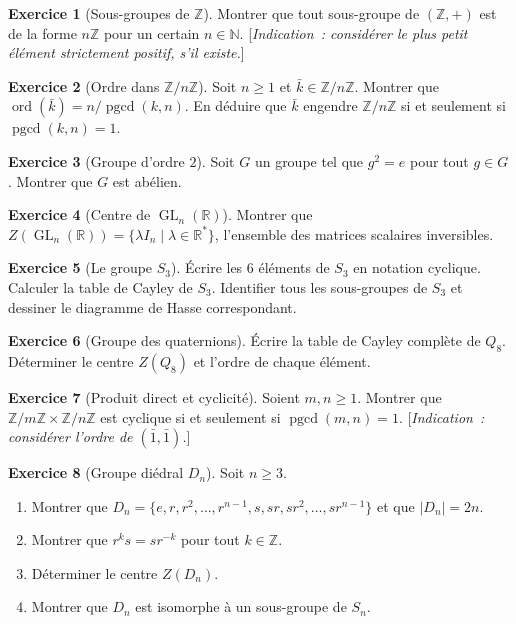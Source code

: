 \documentclass[12pt,a4paper,openany]{book}
\theoremstyle{definition}
\newtheorem{exercice}{Exercice}[chapter]
\newcommand{\N}{\mathbb{N}}
\newcommand{\Z}{\mathbb{Z}}
\newcommand{\R}{\mathbb{R}}
\DeclareMathOperator{\ord}{ord}
\DeclareMathOperator{\pgcd}{pgcd}
\DeclareMathOperator{\GL}{GL}
\newcommand{\abs}[1]{\lvert #1 \rvert}
\begin{document}
\begin{exercice}[Sous-groupes de $\Z$]
\label{exo:sg-Z}
Montrer que tout sous-groupe de $(\Z, +)$ est de la forme $n\Z$ pour un certain $n \in
\N$. [\emph{Indication~: considérer le plus petit élément strictement positif, s'il
existe.}]
\end{exercice}

\begin{exercice}[Ordre dans $\Z/n\Z$]
\label{exo:ordre-ZnZ}
Soit $n \geq 1$ et $\bar{k} \in \Z/n\Z$. Montrer que $\ord(\bar{k}) = n / \pgcd(k,n)$.
En déduire que $\bar{k}$ engendre $\Z/n\Z$ si et seulement si $\pgcd(k, n) = 1$.
\end{exercice}

\begin{exercice}[Groupe d'ordre $2$]
\label{exo:ordre-2-abelien}
Soit $G$ un groupe tel que $g^2 = e$ pour tout $g \in G$. Montrer que $G$ est abélien.
\end{exercice}

\begin{exercice}[Centre de $\GL_n(\R)$]
\label{exo:centre-GLn}
Montrer que $Z(\GL_n(\R)) = \{\lambda I_n \mid \lambda \in \R^*\}$, l'ensemble des
matrices scalaires inversibles.
\end{exercice}

\begin{exercice}[Le groupe $S_3$]
\label{exo:S3-detaille}
Écrire les $6$ éléments de $S_3$ en notation cyclique. Calculer la table de Cayley de
$S_3$. Identifier tous les sous-groupes de $S_3$ et dessiner le diagramme de Hasse
correspondant.
\end{exercice}

\begin{exercice}[Groupe des quaternions]
\label{exo:Q8-table}
Écrire la table de Cayley complète de $Q_8$. Déterminer le centre $Z(Q_8)$ et l'ordre de
chaque élément.
\end{exercice}

\begin{exercice}[Produit direct et cyclicité]
\label{exo:produit-cyclique}
Soient $m, n \geq 1$. Montrer que $\Z/m\Z \times \Z/n\Z$ est cyclique si et seulement
si $\pgcd(m, n) = 1$. [\emph{Indication~: considérer l'ordre de $(\bar{1}, \bar{1})$.}]
\end{exercice}

\begin{exercice}[Groupe diédral $D_n$]
\label{exo:Dn-proprietes}
Soit $n \geq 3$.
\begin{enumerate}[label=(\alph*)]
  \item Montrer que $D_n = \{e, r, r^2, \ldots, r^{n-1}, s, sr, sr^2, \ldots,
    sr^{n-1}\}$ et que $\abs{D_n} = 2n$.
  \item Montrer que $r^k s = s r^{-k}$ pour tout $k \in \Z$.
  \item Déterminer le centre $Z(D_n)$.
  \item Montrer que $D_n$ est isomorphe à un sous-groupe de $S_n$.
\end{enumerate}
\end{exercice}
\end{document}
